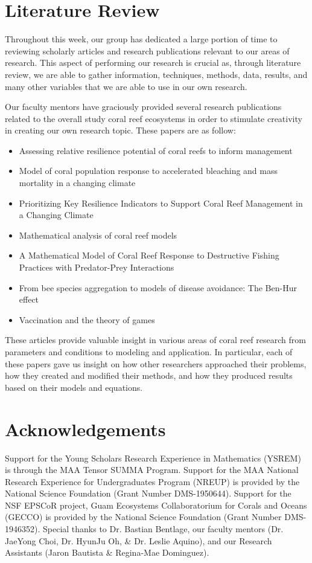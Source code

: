 \documentclass[12pt]{article}
\begin{document}
\section{Literature Review}
Throughout this week, our group has dedicated a large portion of time to reviewing scholarly articles and research publications relevant to our areas of research. This aspect of performing our research is crucial as, through literature review, we are able to gather information, techniques, methods, data, results, and many other variables that we are able to use in our own research. \par
Our faculty mentors have graciously provided several research publications related to the overall study coral reef ecosystems in order to stimulate creativity in creating our own research topic. These papers are as follow:
\begin{itemize}
    \item Assessing relative resilience potential of coral reefs to inform management\cite{01_assesing_relative}
    \item Model of coral population response to accelerated bleaching and mass mortality in a changing climate\cite{02_Riegl_Purkis_Model}
    \item Prioritizing Key Resilience Indicators to Support Coral Reef Management in a Changing Climate\cite{03_prioritize}
    \item Mathematical analysis of coral reef models\cite{04_mathanalysis}
    \item A Mathematical Model of Coral Reef Response to Destructive Fishing Practices with Predator-Prey Interactions\cite{05_quintero_machuca_cotto_bradley_ríos-soto_2016}
    \item From bee species aggregation to models of disease avoidance: The Ben-Hur effect\cite{06_yong_herrera_castillo-chavez_2016}
    \item Vaccination and the theory of games\cite{07_bauch_earn_2004}
\end{itemize}
These articles provide valuable insight in various areas of coral reef research from parameters and conditions to modeling and application. In particular, each of these papers gave us insight on how other researchers approached their problems, how they created and modified their methods, and how they produced results based on their models and equations. 

\section{Acknowledgements}
Support for the Young Scholars Research Experience in Mathematics (YSREM)  is through the MAA Tensor SUMMA Program. Support for the MAA National Research Experience for Undergraduates Program (NREUP) is provided by the National Science Foundation (Grant Number DMS-1950644). Support for the NSF EPSCoR project, Guam Ecosystems Collaboratorium for Corals and Oceans (GECCO) is provided by the National Science Foundation (Grant Number DMS-1946352).
Special thanks to Dr. Bastian Bentlage, our faculty mentors (Dr. JaeYong Choi, Dr. HyunJu Oh, \& Dr. Leslie Aquino), and our Research Assistants (Jaron Bautista \& Regina-Mae Dominguez).

\newpage
% 
% 
\printbibliography
\end{document}
